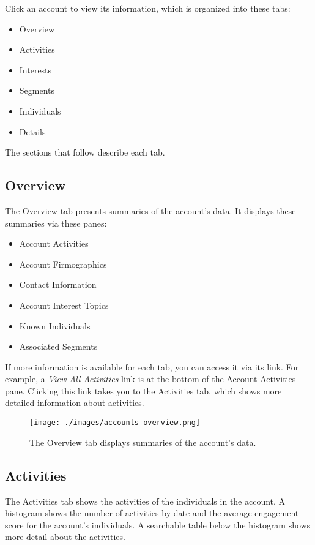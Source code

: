 Click an account to view its information, which is organized into these
tabs:

\begin{itemize}
\tightlist
\item
  Overview
\item
  Activities
\item
  Interests
\item
  Segments
\item
  Individuals
\item
  Details
\end{itemize}

The sections that follow describe each tab.

\subsection{Overview}\label{overview-2}

The Overview tab presents summaries of the account's data. It displays
these summaries via these panes:

\begin{itemize}
\tightlist
\item
  Account Activities
\item
  Account Firmographics
\item
  Contact Information
\item
  Account Interest Topics
\item
  Known Individuals
\item
  Associated Segments
\end{itemize}

If more information is available for each tab, you can access it via its
link. For example, a \emph{View All Activities} link is at the bottom of
the Account Activities pane. Clicking this link takes you to the
Activities tab, which shows more detailed information about activities.

\begin{figure}
\centering
\texttt{[image: ./images/accounts-overview.png]}
\caption{The Overview tab displays summaries of the account's data.}
\end{figure}

\subsection{Activities}\label{activities}

The Activities tab shows the activities of the individuals in the
account. A histogram shows the number of activities by date and the
average engagement score for the account's individuals. A searchable
table below the histogram shows more detail about the activities.

